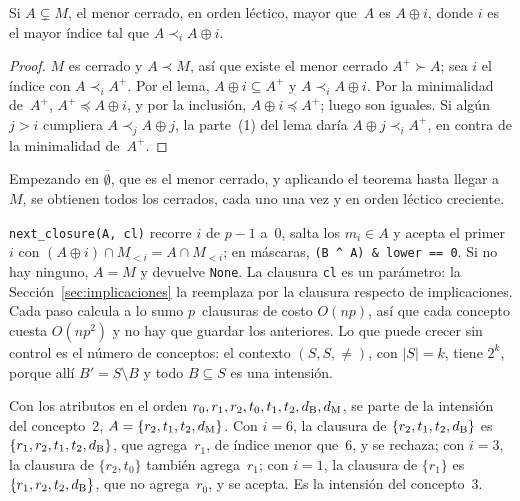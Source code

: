 \begin{teorema}\label{teo:nextclosure}
Si $A \subsetneq M$, el menor cerrado, en orden léctico, mayor que~$A$ es $A \oplus i$, donde $i$ es el mayor índice tal que $A \prec_i A \oplus i$.
\end{teorema}

\begin{proof}
$M$ es cerrado y $A \prec M$, así que existe el menor cerrado $A^{+} \succ A$; sea $i$ el índice con $A \prec_i A^{+}$. Por el lema, $A \oplus i \subseteq A^{+}$ y $A \prec_i A \oplus i$. Por la minimalidad de~$A^{+}$, $A^{+} \preceq A \oplus i$, y por la inclusión, $A \oplus i \preceq A^{+}$; luego son iguales. Si algún $j > i$ cumpliera $A \prec_j A \oplus j$, la parte~(1) del lema daría $A \oplus j \prec_i A^{+}$, en contra de la minimalidad de~$A^{+}$.
\end{proof}

\begin{corolario}[NextClosure]\label{cor:nextclosure}
Empezando en $\overline{\emptyset}$, que es el menor cerrado, y aplicando el teorema hasta llegar a~$M$, se obtienen todos los cerrados, cada uno una vez y en orden léctico creciente.
\end{corolario}

\begin{observacion}\label{obs:nextclosure-codigo}
\texttt{next\_closure(A, cl)} recorre $i$ de $p - 1$ a~0, salta los $m_i \in A$ y acepta el primer~$i$ con $(A \oplus i) \cap M_{<i} = A \cap M_{<i}$; en máscaras, \texttt{(B \textasciicircum{} A) \& lower == 0}. Si no hay ninguno, $A = M$ y devuelve \texttt{None}. La clausura \texttt{cl} es un parámetro: la Sección~\ref{sec:implicaciones} la reemplaza por la clausura respecto de implicaciones. Cada paso calcula a lo sumo $p$~clausuras de costo $O(np)$, así que cada concepto cuesta $O(np^2)$ y no hay que guardar los anteriores. Lo que puede crecer sin control es el número de conceptos: el contexto $(S, S, \ne)$, con $\lvert S \rvert = k$, tiene $2^k$, porque allí $B' = S \setminus B$ y todo $B \subseteq S$ es una intensión.
\end{observacion}

\begin{ejemplo}[un paso]\label{ej:nextclosure}
Con los atributos en el orden $r_0, r_1, r_2, t_0, t_1, t_2, d_{\mathrm{B}}, d_{\mathrm{M}}$, se parte de la intensión del concepto~2, $A = \{r_2, t_1, t_2, d_{\mathrm{M}}\}$. Con $i = 6$, la clausura de $\{r_2, t_1, t_2, d_{\mathrm{B}}\}$ es $\{r_1, r_2, t_1, t_2, d_{\mathrm{B}}\}$, que agrega~$r_1$, de índice menor que~6, y se rechaza; con $i = 3$, la clausura de $\{r_2, t_0\}$ también agrega~$r_1$; con $i = 1$, la clausura de $\{r_1\}$ es $\{r_1, r_2, t_2, d_{\mathrm{B}}\}$, que no agrega~$r_0$, y se acepta. Es la intensión del concepto~3.
\end{ejemplo}


